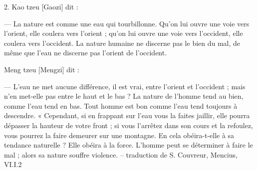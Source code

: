 \begin{singlequote}
    2.	Kao tzeu [Gaozi] dit :
    
—	La nature est comme une eau qui tourbillonne. Qu’on lui ouvre une voie vers l’orient, elle coulera vers l’orient ; qu’on lui ouvre une voie vers l’occident, elle coulera vers l’occident. La nature humaine ne discerne pas le bien du mal, de même que l’eau ne discerne pas l’orient de l’occident.


Meng tzeu [Mengzi] dit :

—	L’eau ne met aucune différence, il est vrai, entre l’orient et l’occident ; mais n’en met-elle pas entre le haut et le bas ? La nature de l’homme tend au bien, comme l’eau tend en bas. Tout homme est bon comme l’eau tend toujours à descendre.
« Cependant, si en frappant sur l’eau vous la faites jaillir, elle pourra dépasser la hauteur de votre front ; si vous l’arrêtez dans son cours et la refoulez, vous pourrez la faire demeurer sur une montagne. En cela obéira-t-elle à sa tendance naturelle ? Elle obéira à la force. L’homme peut se déterminer à faire le mal ; alors sa nature souffre violence.
-- traduction de S. Couvreur, Mencius, VI.I.2
\end{singlequote}


